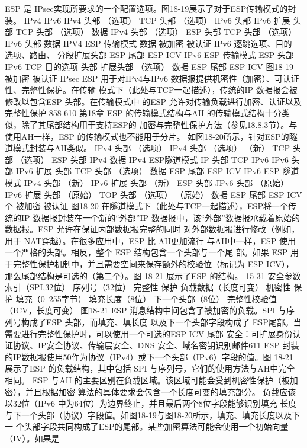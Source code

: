 ESP 是 IPsec实现所要求的一个配置选项。图18-19展示了对于ESP传输模式的封装。
IPv4
IPv6
IPv4
头部
（选项）
TCP
头部
（选项）
IPv6
头部
IPv6
扩展
头部
TCP
头部
（选项）
数据
IPv4
头部
（选项）
ESP
头部
TCP
头部
（选项）
IPv6
头部
数据
IPV4 ESP 传输模式
数据
被加密
被认证
IPv6
逐跳选项、目的
选项、路由、
分段扩展头部
ESP
尾部
ESP
ICV
IPv6 ESP 传输模式
ESP
头部
IPv6
TCP
目的选项
头部
扩展头部
（选项）
数据
ESP
尾部
ESP
ICV
图18-19
被加密
被认证
IPsec ESP 用于对IPv4与IPv6 数据报提供机密性（加密）、可认证性、完整性保护。在传输
模式下（此处与TCP一起描述），传统的IP 数据报会被修改以包含ESP 头部。在传输模式中
的ESP 允许对传输负载进行加密、认证以及完整性保护
858
610
第18章
ESP 的传输模式结构与AH 的传输模式结构十分类似，除了其尾部结构用于支持ESP的
加密与完整性保护方法（参见18.8.3节）。与使用AH一样，ESP 的传输模式也不能用于分片。
如图18-20所示，针对ESP的隧道模式封装与AH类似。
IPv4
头部
（选项）
IPv4
头部
（选项）
（新）
TCP
头部
（选项）
ESP
头部
IPv4
数据
IPv4 ESP隧道模式
IP
头部
TCP
IPv6
IPv6
头部
IPv6
扩展
头部
TCP
头部
（选项）
数据
ESP
尾部
ESP
ICV
IPv6 ESP 隧道模式
IPv4
头部
（新）
IPv6
扩展
头部
（新）
ESP
头部
JPv6
头部
（原始）
IPv6
扩展
头部
（原始）
TOP
头部
（选项）
（原始）
数据
ESP
尾部
ESP
ICV
个
被加密
被认证
图18-20 在隧道模式下（此处与TCP一起描述），ESP将一个传统的IP 数据报封装在一个新的“外部”IP
数据报中，该“外部”数据报承载着原始的数据报。ESP 允许在保证内部数据报完整的同时
对外部数据报进行修改（例如，用于 NAT穿越）。在很多应用中，ESP 比 AH更加流行
与AH中一样，ESP 使用一个严格的头部。相反，整个 ESP 结构包含一个头部与一个尾
部。如果 ESP 用于完整性保护机制中，并且需要空间来保存额外的校验位（标记为 ESP ICV），
那么尾部结构是可选的（第二个）。图 18-21 展示了ESP 的结构。
15
31
安全参数索引（SPI,32位）
序列号（32位）
完整性
保护
负载数据（长度可变）
机密性
保护
填充（0~255字节）
填充长度（8位）
下一个头部（8位）
完整性校验值（ICV，长度可变）
图18-21
ESP 消息结构中间包含了被加密的负载。SPI 与序列号构成了ESP 头部，而填充、填长度
以及下一个头部字段构成了 ESP尾部。当需要进行完整性保护时，可以使用一个可选的ESP
ICV 尾部
安全：可扩展身份认证协议、IP安全协议、传输层安全、DNS 安全、域名密钥识别邮件611
ESP 封装的IP数据报使用50作为协议（IPv4）或下一个头部（IPv6）字段的值。图
18-21 展示了ESP 的负载结构，其中包括 SPI 与序列号，它们的使用方法与AH中完全相同。
ESP 与AH 的主要区别在负载区域。该区域可能会受到机密性保护（被加密），并且根据加密
算法的具体要求会包含一个长度可变的填充部分。
负载应该以32位（IPv6 中为64位）为边界终止，并且最后两个8位字段能够识别填充
长度与下一个头部（协议）字段值。如图18-19与图18-20所示，填充、填充长度以及下一
个头部字段共同构成了ESP的尾部。某些加密算法可能会使用一个初始向量（IV）。如果是
